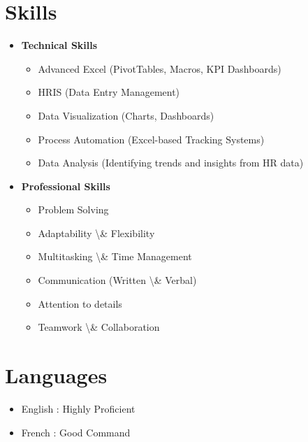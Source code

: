 \documentclass[a4paper,11pt]{article}
\begin{document}
\section*{Skills}
\noindent
\begin{minipage}[t]{0.5\textwidth}
    \begin{itemize}[leftmargin=0.15in, label={}, noitemsep, topsep=0pt]
        \item \textbf{Technical Skills}
        \begin{itemize}[leftmargin=0.2in, topsep=2pt, itemsep=-2pt]
            \item Advanced Excel (PivotTables, Macros, KPI Dashboards)
            \item HRIS (Data Entry Management)
            \item Data Visualization (Charts, Dashboards)
            \item Process Automation (Excel-based Tracking Systems)
            \item Data Analysis (Identifying trends and insights from HR data)
        \end{itemize}
    \end{itemize}
\end{minipage}%
\begin{minipage}[t]{0.5\textwidth}
    \begin{itemize}[leftmargin=0.15in, label={}, noitemsep, topsep=0pt]
        \item \textbf{Professional Skills}
        \begin{itemize}[leftmargin=0.2in, topsep=2pt, itemsep=-2pt]
            \item Problem Solving
            \item Adaptability \textbackslash{}\& Flexibility
            \item Multitasking \textbackslash{}\& Time Management
            \item Communication (Written \textbackslash{}\& Verbal)
            \item Attention to details
            \item Teamwork \textbackslash{}\& Collaboration
        \end{itemize}
    \end{itemize}
\end{minipage}



\section*{Languages}
\begin{itemize}[leftmargin=0.15in, topsep=0pt]
    \item English : Highly Proficient
    \item French : Good Command
\end{itemize}
\end{document}

